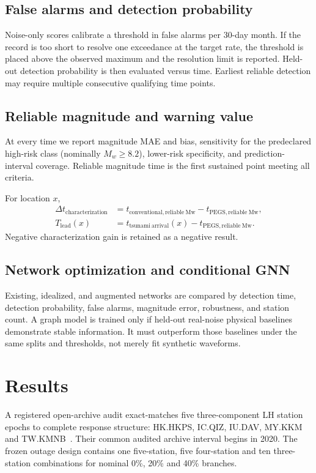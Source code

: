 \documentclass[11pt]{article}
\begin{document}
\subsection{False alarms and detection probability}
Noise-only scores calibrate a threshold in false alarms per 30-day month. If the
record is too short to resolve one exceedance at the target rate, the threshold
is placed above the observed maximum and the resolution limit is reported.
Held-out detection probability is then evaluated versus time. Earliest reliable
detection may require multiple consecutive qualifying time points.

\subsection{Reliable magnitude and warning value}
At every time we report magnitude MAE and bias, sensitivity for the predeclared
high-risk class (nominally $M_w\geq8.2$), lower-risk specificity, and prediction-
interval coverage. Reliable magnitude time is the first sustained point meeting
all criteria.

For location $x$,
\begin{align}
 \Delta t_{\mathrm{characterization}} &=
 t_{\mathrm{conventional,reliable\ Mw}}-t_{\mathrm{PEGS,reliable\ Mw}},\\
 T_{\mathrm{lead}}(x) &= t_{\mathrm{tsunami\ arrival}}(x)
 -t_{\mathrm{PEGS,reliable\ Mw}}.
\end{align}
Negative characterization gain is retained as a negative result.

\subsection{Network optimization and conditional GNN}
Existing, idealized, and augmented networks are compared by detection time,
detection probability, false alarms, magnitude error, robustness, and station
count. A graph model is trained only if held-out real-noise physical baselines
demonstrate stable information. It must outperform those baselines under the
same splits and thresholds, not merely fit synthetic waveforms.

\section{Results}
A registered open-archive audit exact-matches five three-component LH station
epochs to complete response structure: HK.HKPS, IC.QIZ, IU.DAV, MY.KKM and
TW.KMNB~\cite{NetworkHK,NetworkIC,NetworkIU,NetworkMY,NetworkTW}. Their common
audited archive interval begins in 2020. The frozen outage
design contains one five-station, five four-station and ten three-station
combinations for nominal 0\%, 20\% and 40\% branches.
\end{document}
